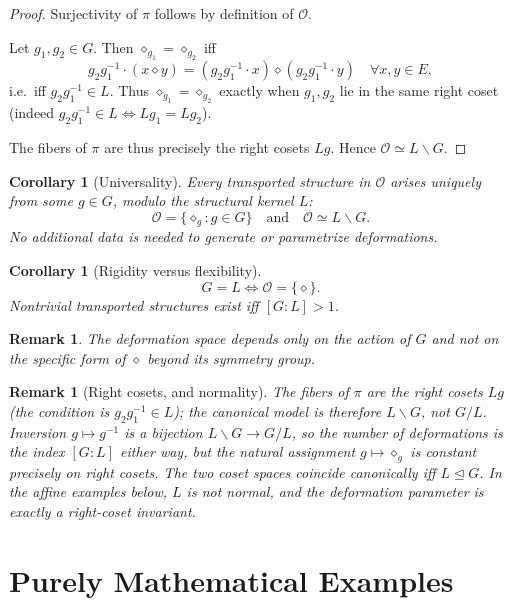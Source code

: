 \documentclass[11pt,a4paper]{article}
\newtheorem{corollary}[theorem]{Corollary}
\newtheorem{remark}[theorem]{Remark}
\begin{document}
	\begin{proof}
		Surjectivity of $\pi$ follows by definition of $\mathcal{O}$.
		
		Let $g_1, g_2 \in G$. Then $\diamond_{g_1} = \diamond_{g_2}$ iff
		\[
		g_2 g_1^{-1} \cdot (x \diamond y) = (g_2 g_1^{-1} \cdot x) \diamond (g_2 g_1^{-1} \cdot y) \quad \forall x,y \in E,
		\]
		i.e.\ iff $g_2 g_1^{-1} \in L$. Thus $\diamond_{g_1} = \diamond_{g_2}$ exactly when $g_1,g_2$ lie in the same right coset (indeed $g_2 g_1^{-1} \in L \iff L g_1 = L g_2$).
		
		The fibers of $\pi$ are thus precisely the right cosets $Lg$. Hence $\mathcal{O} \simeq L\backslash G$.
	\end{proof}
	
	\begin{corollary}[Universality]
		Every transported structure in $\mathcal{O}$ arises uniquely from some $g \in G$, modulo the structural kernel $L$:
		\[
		\mathcal{O} = \{ \diamond_g : g \in G \} \quad \text{and} \quad \mathcal{O} \simeq L\backslash G.
		\]
		No additional data is needed to generate or parametrize deformations.
	\end{corollary}
	
	\begin{corollary}[Rigidity versus flexibility]
		\[
		G = L \iff \mathcal{O} = \{ \diamond \}.
		\]
		Nontrivial transported structures exist iff $[G : L] > 1$.
	\end{corollary}
	
	\begin{remark}
		The deformation space depends only on the action of $G$ and not on the specific form of $\diamond$ beyond its symmetry group.
	\end{remark}

	\begin{remark}[Right cosets, and normality]
		The fibers of $\pi$ are the \emph{right} cosets $Lg$ (the condition is $g_2 g_1^{-1} \in L$); the canonical model is therefore $L\backslash G$, not $G/L$. Inversion $g \mapsto g^{-1}$ is a bijection $L\backslash G \to G/L$, so the \emph{number} of deformations is the index $[G:L]$ either way, but the natural assignment $g \mapsto \diamond_g$ is constant precisely on right cosets. The two coset spaces coincide canonically iff $L \trianglelefteq G$. In the affine examples below, $L$ is not normal, and the deformation parameter is exactly a right-coset invariant.
	\end{remark}
	
	\section{Purely Mathematical Examples}
	
\end{document}
